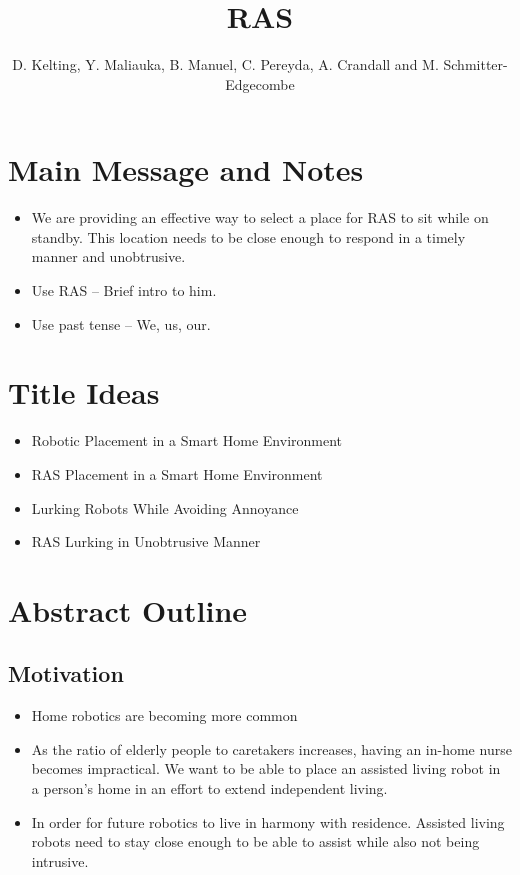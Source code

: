 \documentclass[11pt, conference, a4paper]{IEEEtran}
\author{D. Kelting, Y. Maliauka, B. Manuel, C. Pereyda, A. Crandall and M. Schmitter-Edgecombe}
\title{RAS}
\begin{document}
\maketitle


\section{Main Message and Notes}
\begin{itemize}
	\item We are providing an effective way to select a place for RAS to sit while on standby. This location needs to be close enough to respond in a timely manner and unobtrusive.
	\item Use RAS -- Brief intro to him.
	\item Use past tense -- We, us, our.
\end{itemize}


\section{Title Ideas}
\begin{itemize}
	\item Robotic Placement in a Smart Home Environment
	\item RAS Placement in a Smart Home Environment 
	\item Lurking Robots While Avoiding Annoyance
	\item RAS Lurking in Unobtrusive Manner
\end{itemize}


\section{Abstract Outline}


\subsection{Motivation}
\begin{itemize}
    \item Home robotics are becoming more common
    \item As the ratio of elderly people to caretakers increases, having an 
        in-home nurse becomes impractical. We want to be able to place an assisted living robot 
        in a person's home in an effort to extend independent living.
    \item In order for future robotics to live in harmony with residence. Assisted living robots need 		to stay close enough to be able to assist while also not being intrusive. 
\end{itemize}
\end{document}
